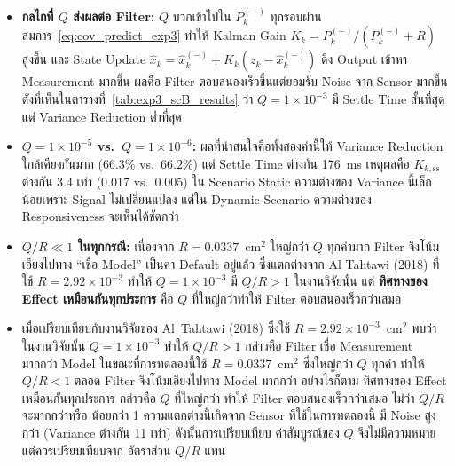 \begin{itemize}
    \item \textbf{กลไกที่ $Q$ ส่งผลต่อ Filter:}
          $Q$ บวกเข้าไปใน $P_k^{(-)}$ ทุกรอบผ่านสมการ~\eqref{eq:cov_predict_exp3}
          ทำให้ Kalman Gain $K_k = P_k^{(-)}/(P_k^{(-)} + R)$ สูงขึ้น
          และ State Update $\hat{x}_k = \hat{x}_k^{(-)} + K_k(z_k - \hat{x}_k^{(-)})$
          ดึง Output เข้าหา Measurement มากขึ้น
          ผลคือ Filter ตอบสนองเร็วขึ้นแต่ยอมรับ Noise จาก Sensor มากขึ้น
          ดังที่เห็นในตารางที่~\ref{tab:exp3_scB_results}
          ว่า $Q = 1\times10^{-3}$ มี Settle Time สั้นที่สุด
          แต่ Variance Reduction ต่ำที่สุด

    \item \textbf{$Q = 1\times10^{-5}$ vs.\ $Q = 1\times10^{-6}$:}
          ผลที่น่าสนใจคือทั้งสองค่านี้ให้ Variance Reduction ใกล้เคียงกันมาก
          ($66.3\%$ vs.\ $66.2\%$) แต่ Settle Time ต่างกัน 176~ms
          เหตุผลคือ $K_{k,\mathrm{ss}}$ ต่างกัน 3.4 เท่า (0.017 vs.\ 0.005)
          ใน Scenario Static ความต่างของ Variance นี้เล็กน้อยเพราะ Signal
          ไม่เปลี่ยนแปลง แต่ใน Dynamic Scenario ความต่างของ Responsiveness
          จะเห็นได้ชัดกว่า

    \item \textbf{$Q/R \ll 1$ ในทุกกรณี:}
          เนื่องจาก $R = 0.0337$~cm$^2$ ใหญ่กว่า $Q$ ทุกค่ามาก
          Filter จึงโน้มเอียงไปทาง ``เชื่อ Model'' เป็นค่า Default อยู่แล้ว
          ซึ่งแตกต่างจาก Al Tahtawi (2018) ที่ใช้ $R = 2.92\times10^{-3}$
          ทำให้ $Q = 1\times10^{-3}$ มี $Q/R > 1$ ในงานวิจัยนั้น
          แต่ \textbf{ทิศทางของ Effect เหมือนกันทุกประการ}
          คือ $Q$ ที่ใหญ่กว่าทำให้ Filter ตอบสนองเร็วกว่าเสมอ

    \item เมื่อเปรียบเทียบกับงานวิจัยของ Al~Tahtawi (2018) ซึ่งใช้
            $R = 2.92\times10^{-3}$~cm$^2$ พบว่าในงานวิจัยนั้น
            $Q = 1\times10^{-3}$ ทำให้ $Q/R > 1$ กล่าวคือ Filter เชื่อ
            Measurement มากกว่า Model ในขณะที่การทดลองนี้ใช้
            $R = 0.0337$~cm$^2$ ซึ่งใหญ่กว่า $Q$ ทุกค่า ทำให้ $Q/R < 1$
            ตลอด Filter จึงโน้มเอียงไปทาง Model มากกว่า อย่างไรก็ตาม
            ทิศทางของ Effect เหมือนกันทุกประการ กล่าวคือ $Q$ ที่ใหญ่กว่า
            ทำให้ Filter ตอบสนองเร็วกว่าเสมอ ไม่ว่า $Q/R$ จะมากกว่าหรือ
            น้อยกว่า 1 ความแตกต่างนี้เกิดจาก Sensor ที่ใช้ในการทดลองนี้
            มี Noise สูงกว่า (Variance ต่างกัน 11 เท่า) ดังนั้นการเปรียบเทียบ
            ค่าสัมบูรณ์ของ $Q$ จึงไม่มีความหมาย แต่ควรเปรียบเทียบจาก
            อัตราส่วน $Q/R$ แทน


\end{itemize}
